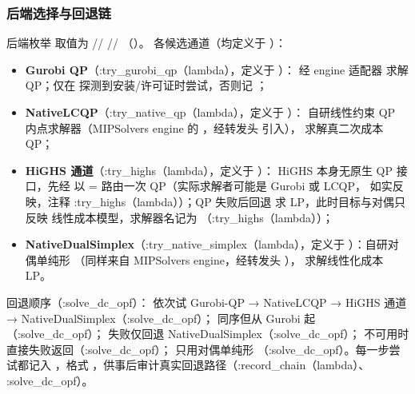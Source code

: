 \subsubsection*{后端选择与回退链}
后端枚举  取值为 //
//
（）。
各候选通道（均定义于 ）：
\begin{itemize}
  \item \textbf{Gurobi QP}（:try\_gurobi\_qp（lambda），定义于 ）：
        经 engine 适配器  求解 QP；仅在
         探测到安装/许可证时尝试，否则记
        ；
  \item \textbf{NativeLCQP}（:try\_native\_qp（lambda），定义于 ）：
        自研线性约束 QP 内点求解器（MIPSolvers engine 的
        ，经转发头
         引入），
        求解真二次成本 QP；
  \item \textbf{HiGHS 通道}（:try\_highs（lambda），定义于 ）：
        HiGHS 本身无原生 QP 接口，先经  以
        = 路由一次 QP（实际求解者可能是
        Gurobi 或 LCQP， 如实反映，注释 :try\_highs（lambda））；QP
        失败后回退  求 LP，此时目标与对偶只反映
        线性成本模型，求解器名记为 
        （:try\_highs（lambda））；
  \item \textbf{NativeDualSimplex}（:try\_native\_simplex（lambda），定义于
        ）：自研对偶单纯形
        （同样来自 MIPSolvers engine，经转发头
        ），
        求解线性化成本 LP。
\end{itemize}
回退顺序（:solve\_dc\_opf）： 依次试 Gurobi-QP → NativeLCQP → HiGHS
通道 → NativeDualSimplex（:solve\_dc\_opf）； 同序但从 Gurobi 起
（:solve\_dc\_opf）； 失败仅回退 NativeDualSimplex（:solve\_dc\_opf）；
 不可用时直接失败返回（:solve\_dc\_opf）； 只用对偶单纯形
（:solve\_dc\_opf）。每一步尝试都记入 ，格式
，供事后审计真实回退路径（:record\_chain（lambda）、
:solve\_dc\_opf）。

